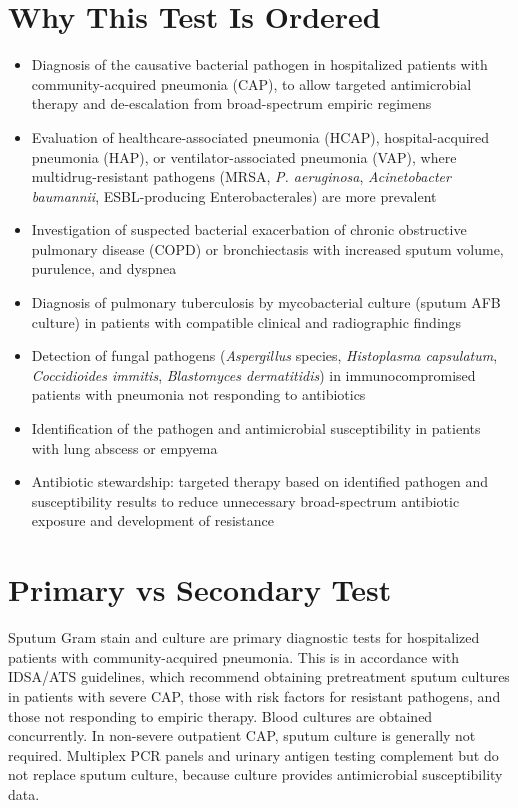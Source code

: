 \section*{Why This Test Is Ordered}
\begin{itemize}
  \item Diagnosis of the causative bacterial pathogen in hospitalized patients with community-acquired pneumonia (CAP), to allow targeted antimicrobial therapy and de-escalation from broad-spectrum empiric regimens
  \item Evaluation of healthcare-associated pneumonia (HCAP), hospital-acquired pneumonia (HAP), or ventilator-associated pneumonia (VAP), where multidrug-resistant pathogens (MRSA, \textit{P. aeruginosa}, \textit{Acinetobacter baumannii}, ESBL-producing Enterobacterales) are more prevalent
  \item Investigation of suspected bacterial exacerbation of chronic obstructive pulmonary disease (COPD) or bronchiectasis with increased sputum volume, purulence, and dyspnea
  \item Diagnosis of pulmonary tuberculosis by mycobacterial culture (sputum AFB culture) in patients with compatible clinical and radiographic findings
  \item Detection of fungal pathogens (\textit{Aspergillus} species, \textit{Histoplasma capsulatum}, \textit{Coccidioides immitis}, \textit{Blastomyces dermatitidis}) in immunocompromised patients with pneumonia not responding to antibiotics
  \item Identification of the pathogen and antimicrobial susceptibility in patients with lung abscess or empyema
  \item Antibiotic stewardship: targeted therapy based on identified pathogen and susceptibility results to reduce unnecessary broad-spectrum antibiotic exposure and development of resistance
\end{itemize}

\section*{Primary vs Secondary Test}
Sputum Gram stain and culture are primary diagnostic tests for hospitalized patients with community-acquired pneumonia. This is in accordance with IDSA/ATS guidelines, which recommend obtaining pretreatment sputum cultures in patients with severe CAP, those with risk factors for resistant pathogens, and those not responding to empiric therapy. Blood cultures are obtained concurrently. In non-severe outpatient CAP, sputum culture is generally not required. Multiplex PCR panels and urinary antigen testing complement but do not replace sputum culture, because culture provides antimicrobial susceptibility data.

